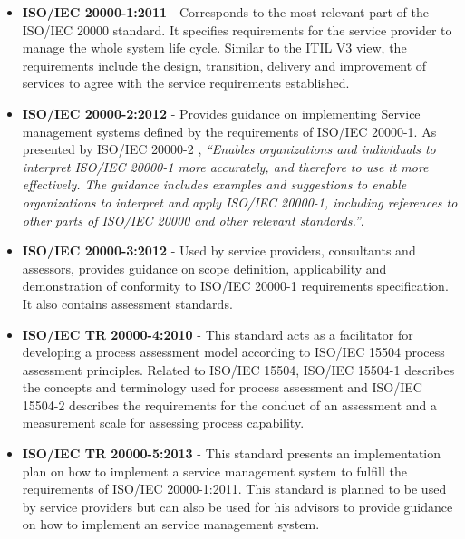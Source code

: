 \begin{itemize}
  \item \textbf{ISO/IEC 20000-1:2011} -  Corresponds to the most relevant part of the ISO/IEC 20000 standard. It specifies requirements for the service provider to manage the whole system life cycle. Similar to the ITIL V3 view, the requirements include the design, transition, delivery and improvement of services to agree with the service requirements established.\cite{ISO20000-1}\par
  
  \vspace{5mm}
  
  \item \textbf{ISO/IEC 20000-2:2012} - Provides guidance on implementing Service management systems defined by the requirements of ISO/IEC 20000-1. As presented by ISO/IEC 20000-2 \cite{ISO20000-2}, \textit{``Enables organizations and individuals to interpret ISO/IEC 20000-1 more accurately, and therefore to use it more effectively. The guidance includes examples and suggestions to enable organizations to interpret and apply ISO/IEC 20000-1, including references to other parts of ISO/IEC 20000 and other relevant standards.''}.\par
  
  \vspace{5mm}
  
  \item \textbf{ISO/IEC 20000-3:2012} - Used by service providers, consultants and assessors, provides guidance on scope definition, applicability and demonstration of conformity to ISO/IEC 20000-1 requirements specification. It also contains assessment standards.\cite{ISO20000-3}\par
  \vspace{5mm}
  
  \item \textbf{ISO/IEC TR 20000-4:2010} - This standard acts as a facilitator for developing a process assessment model according to ISO/IEC 15504 process assessment principles. Related to ISO/IEC 15504, ISO/IEC 15504-1 describes the concepts and terminology used for process assessment and ISO/IEC 15504-2 describes the requirements for the conduct of an assessment and a measurement scale for assessing process capability.\cite{ISO20000-4}\par
  
  \vspace{5mm}
  
  \item \textbf{ISO/IEC TR 20000-5:2013} - This standard presents an implementation plan on how to implement a service management system to fulfill the requirements of ISO/IEC 20000-1:2011. This standard is planned to be used by service providers but can also be used for his advisors to provide guidance on how to implement an service management system.\cite{ISO20000-5}\par
  

\end{itemize}
